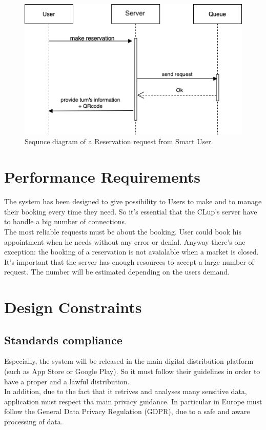 \begin{figure}[H]
  \caption{Sequnce diagram of a Reservation request from Smart User.}
  \label{fig:SD_reservation}
  \centering
  \includegraphics[scale=0.45]{diagrams/SD_reservation.png}

\end{figure}

\bigbreak

\section{Performance Requirements}
The system has been designed to give possibility to Users to make and to manage their booking every time they need. So it's essential that the CLup's server have to handle a big number of connections. \\
The most reliable requests must be about the booking. User could book his appointment when he needs without any error or denial. 
Anyway there's one exception: the booking of a reservation is not avaialable when a market is closed.\\
It's important that the server has enough resources to accept a large number of request. The number will be estimated depending on the users demand.
\bigbreak

\section{Design Constraints}
\subsection{Standards compliance}
Especially, the system will be released in the main digital distribution platform (such as App Store or Google Play). So it must follow their guidelines in order to have a proper and a lawful distribution. \\
In addition, due to the fact that it retrives and analyses many sensitive data, application must respect tha main privacy guidance. In particular in Europe must follow the General Data Privacy Regulation (GDPR), due to a safe and aware processing of data. 
\par

